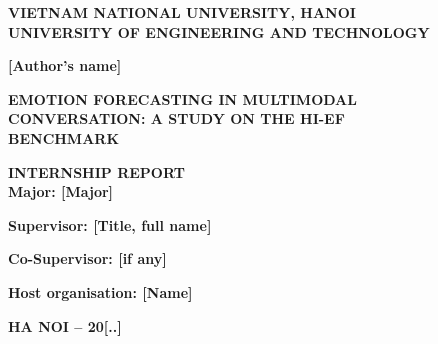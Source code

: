 \begin{titlepage}
\centering
{\fontsize{12}{14}\selectfont\textbf{VIETNAM NATIONAL UNIVERSITY, HANOI}\\
\textbf{UNIVERSITY OF ENGINEERING AND TECHNOLOGY}\par}
\vspace{2.2cm}
{\fontsize{14}{16}\selectfont\textbf{[Author's name]}\par}
\vspace{2.2cm}
{\fontsize{18}{24}\selectfont\textbf{EMOTION FORECASTING IN MULTIMODAL\\CONVERSATION: A STUDY ON THE HI-EF\\BENCHMARK}\par}
\vspace{2.6cm}
{\fontsize{14}{16}\selectfont\textbf{INTERNSHIP REPORT}\\[4pt]
\textbf{Major: [Major]}\par}
\vspace{2.4cm}
\raggedright\leftskip=1.2cm
{\fontsize{14}{16}\selectfont\textbf{Supervisor: [Title, full name]}\par}
\vspace{1.6cm}
{\fontsize{14}{16}\selectfont\textbf{Co-Supervisor: [if any]}\par}
\vspace{1.0cm}
{\fontsize{14}{16}\selectfont\textbf{Host organisation: [Name]}\par}
\vfill
\centering
{\fontsize{12}{14}\selectfont\textbf{HA NOI -- 20[..]}\par}
\vspace*{0.3cm}
\noindent{}
\end{titlepage}
